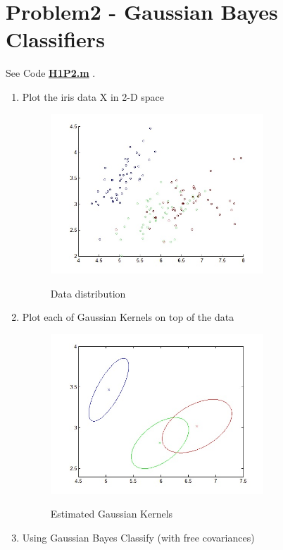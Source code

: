 \documentclass[12pt]{article}
\begin{document}
\section{Problem2 - Gaussian Bayes Classifiers}
See Code \href{./CodeAndData#1/H1P2.m}{\textbf{H1P2.m}} .
\begin{enumerate}
    \item Plot the iris data X in 2-D space

    \begin{figure}[H]
      \centering
      \includegraphics[width=8cm]{fig/2-0.jpg}\\
      \caption{Data distribution}\label{fig1}
    \end{figure}

    \item Plot each of Gaussian Kernels on top of the data

    \begin{figure}[H]
      \centering
      \includegraphics[width=8cm]{fig/2-1.jpg}\\
      \caption{Estimated Gaussian Kernels}\label{fig1}
    \end{figure}

    \item Using Gaussian Bayes Classify (with free covariances)


\end{enumerate}
\end{document}
